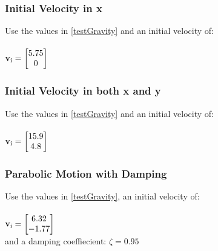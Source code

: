 \documentclass[12pt]{article}
\begin{document}
\subsubsection{Initial Velocity in x} \label{testGravity3}
Use the values in \ref{testGravity} and an initial velocity of: \\ \\
$ \textbf v_\text{i} = \begin{bmatrix}
	5.75\\
	0\\
	\end{bmatrix}$\\
	
\subsubsection{Initial Velocity in both x and y} \label{testGravity4}
Use the values in \ref{testGravity} and an initial velocity of: \\ \\
$ \textbf v_\text{i} = \begin{bmatrix}
	15.9\\
	4.8\\
	\end{bmatrix}$\\
	
	
\subsubsection{Parabolic Motion with Damping} \label{testGravity5}
Use the values in \ref{testGravity}, an initial velocity of: \\ \\
$ \textbf v_\text{i} = \begin{bmatrix}
	6.32\\
	-1.77\\
	\end{bmatrix}$\\
\noindent
and a damping coeffiecient: $\zeta = 0.95$
\end{document}
